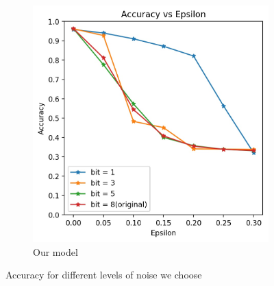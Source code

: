 \begin{figure}[h!]
\begin{subfigure}{.4\textwidth}
		\includegraphics[width=\textwidth]{Accuracy_vs_Epsilon_db.jpg}
		\caption{Our model}
		\label{fig: bit-depth reduction us}
	\end{subfigure}
	\caption{Accuracy for different levels of noise we choose}
\end{figure}



